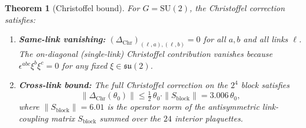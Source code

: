 \documentclass[11pt]{article}
\newtheorem{theorem}{Theorem}[section]
\theoremstyle{definition}
\newcommand{\SU}{\mathrm{SU}}
\newcommand{\su}{\mathfrak{su}}
\begin{document}
\begin{theorem}[Christoffel bound]\label{thm:antisym}
For $G=\SU(2)$, the Christoffel correction satisfies:
\begin{enumerate}[nosep,label=(\roman*)]
\item \textbf{Same-link vanishing:}
$(\Delta_{\mathrm{Chr}})_{(\ell,a),(\ell,b)}=0$ for all
$a,b$ and all links $\ell$.  The on-diagonal (single-link)
Christoffel contribution vanishes because
$\epsilon^{abc}\xi^b\xi^c=0$ for any fixed $\xi\in\su(2)$.
\item \textbf{Cross-link bound:}
The full Christoffel correction on the $2^4$ block satisfies
\begin{equation}\label{eq:chrbound}
\|\Delta_{\mathrm{Chr}}(\theta_0)\|
\le\tfrac{1}{2}\,\theta_0\cdot\|S_{\mathrm{block}}\|
=3.006\,\theta_0,
\end{equation}
where $\|S_{\mathrm{block}}\|=6.01$ is the operator norm of the
antisymmetric link-coupling matrix $S_{\mathrm{block}}$ summed over
the $24$ interior plaquettes.
\end{enumerate}
\end{theorem}
\end{document}
